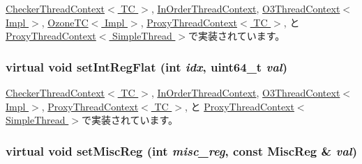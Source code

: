 \hyperlink{classCheckerThreadContext_abc264e8ee37c6bd7d7b5759b97c34356}{CheckerThreadContext$<$ TC $>$}, \hyperlink{classInOrderThreadContext_abc264e8ee37c6bd7d7b5759b97c34356}{InOrderThreadContext}, \hyperlink{classO3ThreadContext_a8fef3127de63ab5e7f7414ea8137c2b1}{O3ThreadContext$<$ Impl $>$}, \hyperlink{classOzoneCPU_1_1OzoneTC_abc264e8ee37c6bd7d7b5759b97c34356}{OzoneTC$<$ Impl $>$}, \hyperlink{classProxyThreadContext_abc264e8ee37c6bd7d7b5759b97c34356}{ProxyThreadContext$<$ TC $>$}, と \hyperlink{classProxyThreadContext_abc264e8ee37c6bd7d7b5759b97c34356}{ProxyThreadContext$<$ SimpleThread $>$}で実装されています。\hypertarget{classThreadContext_a017c099cd6087484b0eb1892809b0572}{
\subsubsection[{setIntRegFlat}]{\setlength{\rightskip}{0pt plus 5cm}virtual void setIntRegFlat (int {\em idx}, \/  uint64\_\-t {\em val})}}
\label{classThreadContext_a017c099cd6087484b0eb1892809b0572}


\hyperlink{classCheckerThreadContext_ae3b8c9c2c1ae95767f0703357957a3f8}{CheckerThreadContext$<$ TC $>$}, \hyperlink{classInOrderThreadContext_ae3b8c9c2c1ae95767f0703357957a3f8}{InOrderThreadContext}, \hyperlink{classO3ThreadContext_ae3b8c9c2c1ae95767f0703357957a3f8}{O3ThreadContext$<$ Impl $>$}, \hyperlink{classProxyThreadContext_ae3b8c9c2c1ae95767f0703357957a3f8}{ProxyThreadContext$<$ TC $>$}, と \hyperlink{classProxyThreadContext_ae3b8c9c2c1ae95767f0703357957a3f8}{ProxyThreadContext$<$ SimpleThread $>$}で実装されています。\hypertarget{classThreadContext_a074166dc2fe3c4aea3ad588ed9883c51}{
\subsubsection[{setMiscReg}]{\setlength{\rightskip}{0pt plus 5cm}virtual void setMiscReg (int {\em misc\_\-reg}, \/  const {\bf MiscReg} \& {\em val})}}
\label{classThreadContext_a074166dc2fe3c4aea3ad588ed9883c51}


